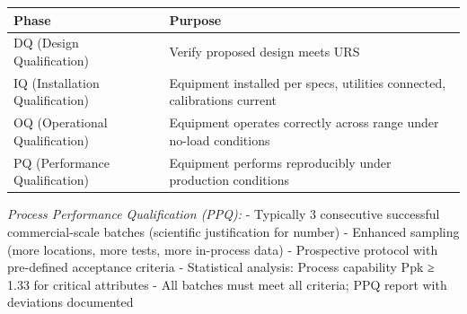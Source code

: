 \documentclass[
  11pt,
  a4paper,
]{report}
\begin{document}
\begin{longtable}[]{@{}ll@{}}
\toprule
\begin{minipage}[b]{0.41\columnwidth}\raggedright
Phase\strut
\end{minipage} & \begin{minipage}[b]{0.53\columnwidth}\raggedright
Purpose\strut
\end{minipage}\tabularnewline
\midrule
\endhead
\begin{minipage}[t]{0.41\columnwidth}\raggedright
DQ (Design Qualification)\strut
\end{minipage} & \begin{minipage}[t]{0.53\columnwidth}\raggedright
Verify proposed design meets URS\strut
\end{minipage}\tabularnewline
\begin{minipage}[t]{0.41\columnwidth}\raggedright
IQ (Installation Qualification)\strut
\end{minipage} & \begin{minipage}[t]{0.53\columnwidth}\raggedright
Equipment installed per specs, utilities connected, calibrations
current\strut
\end{minipage}\tabularnewline
\begin{minipage}[t]{0.41\columnwidth}\raggedright
OQ (Operational Qualification)\strut
\end{minipage} & \begin{minipage}[t]{0.53\columnwidth}\raggedright
Equipment operates correctly across range under no-load conditions\strut
\end{minipage}\tabularnewline
\begin{minipage}[t]{0.41\columnwidth}\raggedright
PQ (Performance Qualification)\strut
\end{minipage} & \begin{minipage}[t]{0.53\columnwidth}\raggedright
Equipment performs reproducibly under production conditions\strut
\end{minipage}\tabularnewline
\bottomrule
\end{longtable}

\emph{Process Performance Qualification (PPQ):} - Typically 3
consecutive successful commercial-scale batches (scientific
justification for number) - Enhanced sampling (more locations, more
tests, more in-process data) - Prospective protocol with pre-defined
acceptance criteria - Statistical analysis: Process capability Ppk ≥
1.33 for critical attributes - All batches must meet all criteria; PPQ
report with deviations documented
\end{document}
